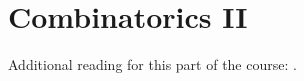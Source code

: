 

\setcounter{section}{1}
\setcounter{subsection}{0}
\setcounter{dfn}{37}

\chapter{Combinatorics II}
Additional reading for this part of the course: \cite{Aig07}.


